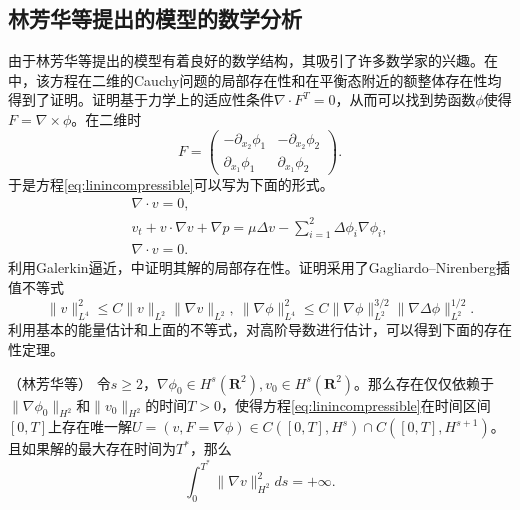 \subsection{林芳华等提出的模型的数学分析}
由于林芳华等提出的模型有着良好的数学结构，其吸引了许多数学家的兴趣\cite{lin2005hydrodynamics,lebon2008classical,qian2010well,qian2011initial,hu2012formation,hu2015global}。在\cite{lin2005hydrodynamics}中，该方程在二维的Cauchy问题的局部存在性和在平衡态附近的额整体存在性均得到了证明。证明基于力学上的适应性条件$\nabla \cdot F^T=0$，从而可以找到势函数$\phi$使得$F = \nabla \times \phi$。在二维时
\begin{equation*}
	F = \left( \begin{matrix}
		-\partial_{x_2} \phi_1 &　-\partial_{x_2} \phi_2 \\
		\partial_{x_1} \phi_1 & \partial_{x_1} \phi_2
	\end{matrix}\right).
\end{equation*}
于是方程\eqref{eq:linincompressible}可以写为下面的形式。
\begin{eqnarray*}
	\nabla \cdot v = 0, \\
	v_t + v \cdot \nabla v + \nabla p =  \mu \Delta v - \sum_{i=1}^2 \Delta \phi_i \nabla \phi_i, \\
	\nabla \cdot v = 0.
\end{eqnarray*}
利用Galerkin逼近，\cite{lin2005hydrodynamics}中证明其解的局部存在性。证明采用了Gagliardo–Nirenberg插值不等式
\begin{equation*}
	\|v\|_{L^4}^2 \le C \|v\|_{L^2} \| \nabla v\|_{L^2} ,\ \|\nabla \phi\|_{L^4}^2 \le C \|\nabla \phi\|_{L^2}^{3/2} \|\nabla \Delta \phi\|_{L^2}^{1/2}.
\end{equation*}
利用基本的能量估计和上面的不等式，对高阶导数进行估计，可以得到下面的存在性定理。
\begin{theorem}（林芳华等\cite{lin2005hydrodynamics}）
	令$s \ge 2$，$\nabla \phi_0 \in H^s(\mathbf{R}^2),v_0 \in H^s(\mathbf{R}^2)$。那么存在仅仅依赖于$\|\nabla \phi_0\|_{H^2}$和$\|v_0\|_{H^2}$的时间$T>0$，使得方程\eqref{eq:linincompressible}在时间区间$[0,T]$上存在唯一解$U=(v,F=\nabla \phi) \in C([0,T],H^s) \cap C([0,T],H^{s+1})$。且如果解的最大存在时间为$T^*$，那么
	\begin{equation*}
		\int_0^{T^*} \|\nabla v\|_{H^2}^2 ds = + \infty.
	\end{equation*}
\end{theorem}

